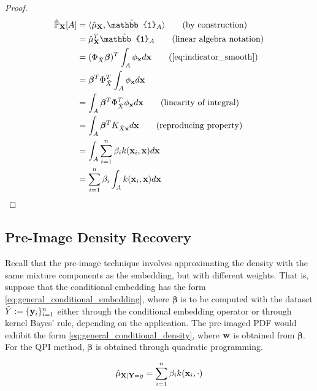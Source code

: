\documentclass[twoside]{article} \usepackage{aistats2017}
\theoremstyle{definition}
\theoremstyle{theorem}
\newcommand{\rv}[1]{{#1}}
\newcommand{\ds}[1]{\tilde{#1}}
\newcommand{\qpi}{QPI }
\newcommand{\inner}[2]{{\langle #1, #2 \rangle}}
\begin{document}
		\begin{proof}
			\begin{align*}
					\hat{\mathbb{P}}_{\bvec{\rv{X}}}[A] &= \inner{\hat{\mu}_{\bvec{\rv{X}}}}{\tilde{\mathbb{1}}_{A}} \tag{by construction} \\
					&= \hat{\mu}_{\bvec{\rv{X}}}^{T} \tilde{\mathbb{1}}_{A} \tag{linear algebra notation} \\
					&= (\Phi_{\ds{X}} \bm{\beta})^{T} \int_{A} \phi_{\bvec{x}} d\bvec{x} \tag{\cref{eq:indicator_smooth}} \\
					&= \bm{\beta}^{T} \Phi_{\ds{X}}^{T} \int_{A} \phi_{\bvec{x}} d\bvec{x} \\
					&= \int_{A} \bm{\beta}^{T} \Phi_{\ds{X}}^{T} \phi_{\bvec{x}} d\bvec{x} \tag{linearity of integral} \\
					&= \int_{A} \bm{\beta}^{T} K_{\ds{X} \bvec{x}} d\bvec{x} \tag{reproducing property} \\
					&= \int_{A} \sum_{i = 1}^{n} \beta_{i} k(\bvec{x}_{i}, \bvec{x}) d\bvec{x} \\
					&= \sum_{i = 1}^{n} \beta_{i} \int_{A}  k(\bvec{x}_{i}, \bvec{x}) d\bvec{x} \\
			\end{align*}
		\end{proof}
		
	\subsection{Pre-Image Density Recovery}
		
		Recall that the pre-image technique involves approximating the density with the same mixture components as the embedding, but with different weights. That is, suppose that the conditional embedding has the form \eqref{eq:general_conditional_embedding}, where $\bm{\beta}$ is to be computed with the dataset $\ds{Y} := \{\bvec{y}_{i}\}_{i = 1}^{n}$ either through the conditional embedding operator or through kernel Bayes' rule, depending on the application. The pre-imaged PDF would exhibit the form \eqref{eq:general_conditional_density}, where $\mathbf{w}$ is obtained from $\bm{\beta}$. For the \qpi\space method, $\bm{\beta}$ is obtained through quadratic programming.

		\begin{equation}
			\hat{\mu}_{\mathbf{X} | \mathbf{Y} = y}= \sum_{i = 1}^{n} \beta_{i} k(\mathbf{x}_{i}, \cdot)
		\label{eq:general_conditional_embedding}
		\end{equation}
		
\end{document}
